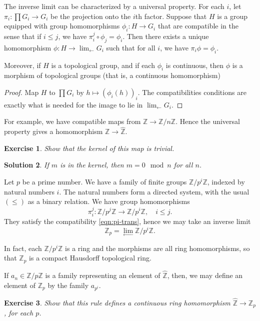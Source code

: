 \documentclass{amsart}
\newcommand{\ring}[1]{\mathbb{#1}}
\newtheorem{exercise}{Exercise}
\newtheorem{solution}[exercise]{Solution}
\begin{document}
The inverse limit can be characterized by a universal property.  
For each $i$, let $\pi_i: \prod G_i\to G_i$ be the projection onto the $i$th factor.
Suppose that
$H$ is a group equipped with group homomorphisms $\phi_i:H \to G_i$ that are compatible
in the sense that if $i\le j$, we have $\pi^j_i\circ \phi_j = \phi_i$.  Then
there exists a unique homomorphism $\phi:H\to \lim_{\leftarrow} G_i$ such that
for all $i$, we have $\pi_i\phi = \phi_i$.

Moreover, if $H$ is a topological group, and if each $\phi_i$ is continuous, then
$\phi$ is a morphism of topological groups (that is, a continuous homomorphism)

\begin{proof} Map $H$ to $\prod G_i$ by $h\mapsto (\phi_i(h))_i$.  The
  compatibilities conditions are exactly what is needed for the image
  to lie in $\lim_{\leftarrow} G_i$.
\end{proof}

For example, we have compatible maps from $\ring{Z}\to \ring{Z}/n\ring{Z}$.
Hence the universal property gives a homomorphism
$\ring{Z}\to \hat{\ring{Z}}$.

\begin{exercise}
Show that the kernel of this map is trivial.
\end{exercise}

\begin{solution}  If $m$ is in the kernel, then $m = 0 \mod n$ for all $n$.
\end{solution}



Let $p$ be a prime number.  We have a family of finite groups $\ring{Z}/p^i\ring{Z}$,
indexed by natural numbers $i$.  The natural numbers form a directed system,
with the usual $(\le)$ as a binary relation.  We have group homomorphisms
\[
\pi^j_i:\ring{Z}/p^j\ring{Z} \to \ring{Z}/p^i\ring{Z},\quad i\le j.
\]
They satisfy the compatibility \eqref{eqn:pi-trans}, hence we may take an inverse
limit
\[
\ring{Z}_p = \lim_{\leftarrow} \ring{Z}/p^i\ring{Z}.
\]


In fact, each $\ring{Z}/p^i\ring{Z}$ is a ring and the morphisms are all ring
homomorphisms, so that $\ring{Z}_p$ is a compact Hausdorff topological ring.



If $a_n\in \ring{Z}/p\ring{Z}$ is a family representing an element of $\hat{\ring{Z}}$,
then, we may define an element of $\ring{Z}_p$ by the family
$a_{p^i}$.  

\begin{exercise}  Show that this rule defines a continuous ring homomorphism
$\hat{\ring{Z}}\to\ring{Z}_p$, for each $p$.
\end{exercise}
\end{document}

